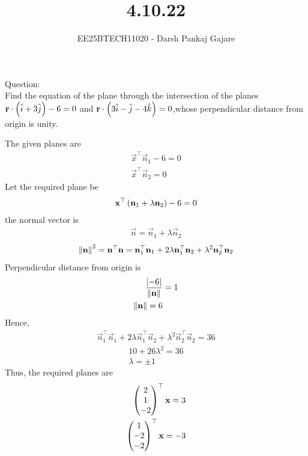 \documentclass{beamer}
\let\solution\relax
\numberwithin{equation}{section}
\begin{document}
\title{4.10.22}
\author{EE25BTECH11020 - Darsh Pankaj Gajare}
{\let\newpage\relax\maketitle}
Question:\\
Find the equation of the plane through the intersection of the planes $\mathbf{r}\cdot\left(\hat{i}+3\hat{j}\right)-6=0$ and $\mathbf{r}\cdot\left(3\hat{i}-\hat{j}-4\hat{k}\right)=0$,whose perpendicular distance from origin is unity.\\
\solution
\begin{table}[H]
	\centering
	\caption{}
	
	\label{}
\end{table}
\solution
The given planes are
\begin{align}
\vec{x}^\top\vec{n}_1 - 6 = 0 \\
\vec{x}^\top\vec{n}_2 = 0
\end{align}
Let the required plane be
\begin{align}
\mathbf{x}^\top\left(\mathbf{n}_1 + \lambda\mathbf{n}_2\right) - 6 = 0
\end{align}
the normal vector is
\begin{align}
\vec{n} = \vec{n}_1 + \lambda\vec{n}_2
\end{align}
\begin{align}
\left\lVert\mathbf{n}\right\rVert^2 = \mathbf{n}^\top\mathbf{n}= \mathbf{n}_1^\top\mathbf{n}_1 + 2\lambda\mathbf{n}_1^\top\mathbf{n}_2 + \lambda^2 \mathbf{n}_2^\top\mathbf{n}_2
\end{align}
Perpendicular distance from origin is
\begin{align}
\frac{\left\vert-6\right\vert}{\left\lVert\mathbf{n}\right\rVert} &= 1 \\
\left\lVert\mathbf{n}\right\rVert = 6
\end{align}
Hence,
\begin{align}
\vec{n}_1^\top\vec{n}_1 + 2\lambda\vec{n}_1^\top\vec{n}_2 + \lambda^2 \vec{n}_2^\top\vec{n}_2 = 36
\end{align}
\begin{align}
10 + 26\lambda^2 = 36 \\
\lambda = \pm 1
\end{align}
Thus, the required planes are
\begin{align}
	\begin{pmatrix}2\\1\\-2\end{pmatrix}^\top\mathbf{x}=3\\
	\begin{pmatrix}1\\-2\\-2\end{pmatrix}^\top\mathbf{x}=-3
\end{align}
\end{document}
